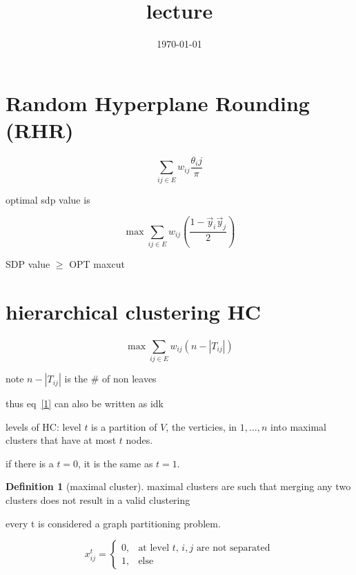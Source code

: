 \documentclass{article}
\title{lecture}
\date{\today}
\theoremstyle{definition}
\newtheorem{definition}{Definition}
\newcommand{\abs}[1]{\left| #1 \right|}
\begin{document}
\maketitle

\section{Random Hyperplane Rounding (RHR)}

\begin{equation}
    \sum_{ij\in E}^{}w_{ij} \frac{\theta_ij}{\pi}
\end{equation}


optimal sdp value is 

\begin{equation}
    \max \sum_{ij\in E}^{} w_{ij}\left( \frac{1-\vec y_i\vec y_j}{2} \right)
\end{equation}


SDP value \(\geq\) OPT maxcut

\section{ hierarchical clustering HC}

\begin{equation}\label{1}
    \max \sum_{ij\in E}^{} w_{ij}\left( n-\abs{T_{ij}} \right)
\end{equation}

note \(n-\abs{T_{ij}}\) is the \# of non leaves

thus eq~\ref{1} can also be written as idk

levels of HC:
level \(t\) is a partition of \(V\), the verticies, in \(1,\dots, n\) into maximal clusters that have at most \(t\) nodes. 

if there is a \(t=0\), it is the same as \(t=1\).

\begin{definition}[maximal cluster]
    maximal clusters are such that merging any two clusters does not result in a valid clustering
\end{definition}


every t is considered a graph partitioning problem.

\begin{equation}
    x_{ij}^t=\begin{cases}
        0, &\text{at level $t$, $i,j$ are not separated}\\
        1, &\text{else}
    \end{cases}
\end{equation}
\end{document}

